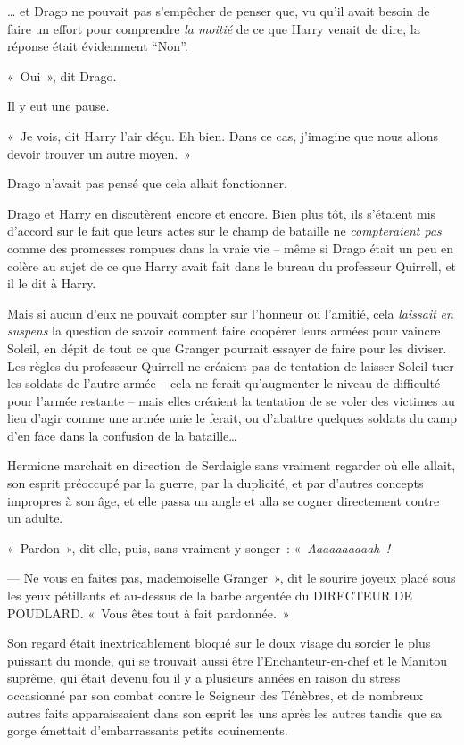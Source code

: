 … et Drago ne pouvait pas s'empêcher de penser que, vu qu'il avait besoin de faire un effort pour comprendre \emph{la moitié} de ce que Harry venait de dire, la réponse était évidemment “Non”.

«~Oui~», dit Drago.

Il y eut une pause.

«~Je vois, dit Harry l'air déçu.
Eh bien.
Dans ce cas, j'imagine que nous allons devoir trouver un autre moyen.~»

Drago n'avait pas pensé que cela allait fonctionner.

Drago et Harry en discutèrent encore et encore.
Bien plus tôt, ils s'étaient mis d'accord sur le fait que leurs actes sur le champ de bataille ne \emph{compteraient pas} comme des promesses rompues dans la vraie vie -- même si Drago était un peu en colère au sujet de ce que Harry avait fait dans le bureau du professeur Quirrell, et il le dit à Harry.

Mais si aucun d'eux ne pouvait compter sur l'honneur ou l'amitié, cela \emph{laissait} \emph{en suspens} la question de savoir comment faire coopérer leurs armées pour vaincre Soleil, en dépit de tout ce que Granger pourrait essayer de faire pour les diviser.
Les règles du professeur Quirrell ne créaient pas de tentation de laisser Soleil tuer les soldats de l'autre armée -- cela ne ferait qu'augmenter le niveau de difficulté pour l'armée restante -- mais elles créaient la tentation de se voler des victimes au lieu d'agir comme une armée unie le ferait, ou d'abattre quelques soldats du camp d'en face dans la confusion de la bataille…

\later

Hermione marchait en direction de Serdaigle sans vraiment regarder où elle allait, son esprit préoccupé par la guerre, par la duplicité, et par d'autres concepts impropres à son âge, et elle passa un angle et alla se cogner directement contre un adulte.

«~Pardon~», dit-elle, puis, sans vraiment y songer~: «~\emph{Aaaaaaaaaah~!}

--- Ne vous en faites pas, mademoiselle Granger~», dit le sourire joyeux placé sous les yeux pétillants et au-dessus de la barbe argentée du DIRECTEUR DE POUDLARD.
«~Vous êtes tout à fait pardonnée.~»

Son regard était inextricablement bloqué sur le doux visage du sorcier le plus puissant du monde, qui se trouvait aussi être l'Enchanteur-en-chef et le Manitou suprême, qui était devenu fou il y a plusieurs années en raison du stress occasionné par son combat contre le Seigneur des Ténèbres, et de nombreux autres faits apparaissaient dans son esprit les uns après les autres tandis que sa gorge émettait d'embarrassants petits couinements.

